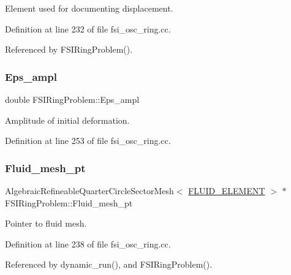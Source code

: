 Element used for documenting displacement. 



Definition at line 232 of file fsi\+\_\+osc\+\_\+ring.\+cc.



Referenced by F\+S\+I\+Ring\+Problem().

\mbox{\label{classFSIRingProblem_a6e14af107a8f5b5a5254a55f0707ff4c}} 
\subsubsection{\texorpdfstring{Eps\+\_\+ampl}{Eps\_ampl}}
{\footnotesize\ttfamily double F\+S\+I\+Ring\+Problem\+::\+Eps\+\_\+ampl\hspace{0.3cm}{\ttfamily [private]}}



Amplitude of initial deformation. 



Definition at line 253 of file fsi\+\_\+osc\+\_\+ring.\+cc.

\mbox{\label{classFSIRingProblem_a33eec722bed7a0b02444c64d3e6c66fe}} 
\subsubsection{\texorpdfstring{Fluid\+\_\+mesh\+\_\+pt}{Fluid\_mesh\_pt}}
{\footnotesize\ttfamily Algebraic\+Refineable\+Quarter\+Circle\+Sector\+Mesh$<$ \hyperlink{classFSIRingProblem_a2ce9ba3122272853bfa6ec3fcf39b78a}{F\+L\+U\+I\+D\+\_\+\+E\+L\+E\+M\+E\+NT} $>$ $\ast$ F\+S\+I\+Ring\+Problem\+::\+Fluid\+\_\+mesh\+\_\+pt\hspace{0.3cm}{\ttfamily [private]}}



Pointer to fluid mesh. 



Definition at line 238 of file fsi\+\_\+osc\+\_\+ring.\+cc.



Referenced by dynamic\+\_\+run(), and F\+S\+I\+Ring\+Problem().

